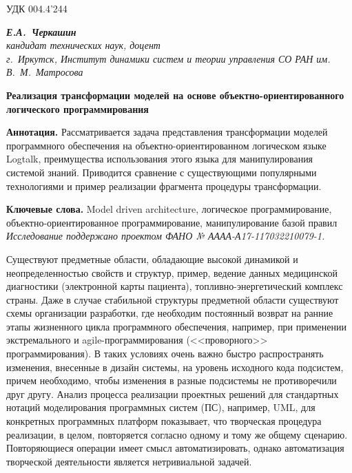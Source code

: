 \documentclass[12pt]{article}
\begin{document}
УДК 004.4'244
\begin{flushright}\itshape{}
  \textbf{Е.А.~Черкашин}\\
  кандидат технических наук, доцент\\
  г.~Иркутск, Институт динамики систем и теории управления СО РАН им. В.~М.~Матросова
\end{flushright}
\begin{center}
  \Large\bfseries Реализация трансформации моделей на основе объектно-ориентированного логического программирования
\end{center}

\textbf{Аннотация.} Рассматривается задача представления трансформации моделей программного обеспечения на объектно-ориентированном логическом языке Logtalk, преимущества использования этого языка для манипулирования системой знаний.  Приводится сравнение с существующими популярными технологиями и пример реализации фрагмента процедуры трансформации.

\textbf{Ключевые слова.} Model driven architecture, логическое программирование, объектно-ориентированное программирование, манипулирование базой правил\\

\textit{Исследование поддержано проектом ФАНО № АААА-А17-117032210079-1.}

Существуют предметные области, обладающие высокой динамикой и неопределенностью свойств и структур, пример, ведение данных медицинской диагностики (электронной карты пациента), топливно-энергетический комплекс страны.  Даже в случае стабильной структуры предметной области существуют схемы организации разработки, где необходим постоянный возврат на ранние этапы жизненного цикла программного обеспечения, например, при применении экстремального и agile-программирования (<<проворного>> программирования).  В таких условиях очень важно быстро распространять изменения, внесенные в дизайн системы, на уровень исходного кода подсистем, причем необходимо, чтобы изменения в разные подсистемы не противоречили друг другу.  Анализ процесса реализации проектных решений для стандартных нотаций моделирования программных систем (ПС), например, UML, для конкретных программных платформ показывает, что творческая процедура реализации, в целом, повторяется согласно одному и тому же общему сценарию.  Повторяющиеся операции имеет смысл автоматизировать, однако автоматизация творческой деятельности является нетривиальной задачей.
\end{document}
